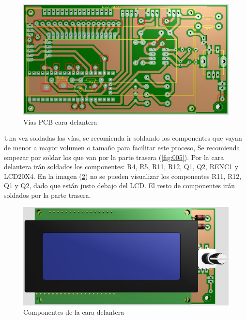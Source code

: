\documentclass[10pt,a4paper,oneside]{article}
\begin{document}
\begin{figure}[H]
\centering
\includegraphics[scale=0.5]{Imagenes/PCB_CARA_DELANTERA_VIAS.jpg}
\caption[Vista de las vias de la cara delantera de la PCB tras el proceso de insolado]{Vías PCB cara delantera}
\label{fig:003}
\end{figure}

Una vez soldadas las vías, se recomienda ir soldando los componentes que vayan de menor a mayor volumen o tamaño para facilitar este proceso, Se recomienda empezar por soldar los que van por la parte trasera (\ref{fig:005}).
Por la cara delantera irán soldados los componentes: R4, R5, R11, R12, Q1, Q2, RENC1 y LCD20X4. En la imagen (\ref{fig:004}) no se pueden visualizar los componentes R11, R12, Q1 y Q2, dado que están justo debajo del LCD. El resto de componentes irán soldados por la parte trasera.

\begin{figure}[H]
\centering
\includegraphics[scale=0.5]{Imagenes/PCB_COMPONENTES_CARA_DELANTERA.jpg}
\caption[Vista de los componentes de la cara delantera de la PCB]{Componentes de la cara delantera}
\label{fig:004}
\end{figure}
\end{document}
